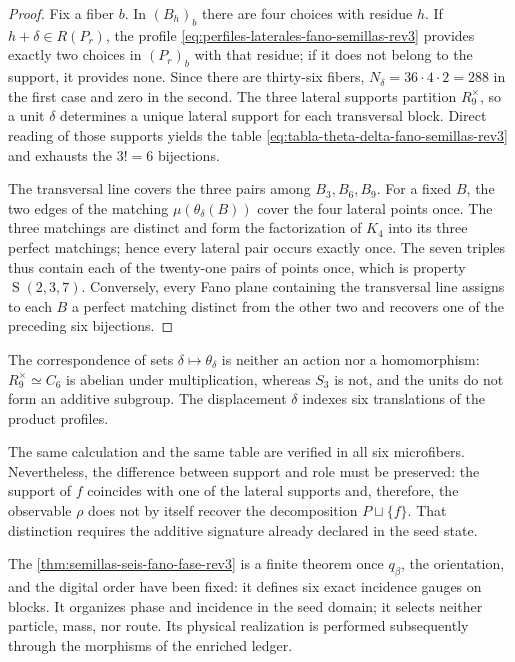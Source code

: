 \begin{proof}
Fix a fiber \(b\). In \((B_h)_b\) there are four choices with residue \(h\). If \(h+\delta\in R(P_r)\), the profile \eqref{eq:perfiles-laterales-fano-semillas-rev3} provides exactly two choices in \((P_r)_b\) with that residue; if it does not belong to the support, it provides none. Since there are thirty-six fibers, \(N_\delta=36\cdot4\cdot2=288\) in the first case and zero in the second. The three lateral supports partition \(R_9^\times\), so a unit \(\delta\) determines a unique lateral support for each transversal block. Direct reading of those supports yields the table \eqref{eq:tabla-theta-delta-fano-semillas-rev3} and exhausts the \(3!=6\) bijections.

The transversal line covers the three pairs among \(B_3,B_6,B_9\). For a fixed \(B\), the two edges of the matching \(\mu(\theta_\delta(B))\) cover the four lateral points once. The three matchings are distinct and form the factorization of \(K_4\) into its three perfect matchings; hence every lateral pair occurs exactly once. The seven triples thus contain each of the twenty-one pairs of points once, which is property \(\operatorname{S}(2,3,7)\). Conversely, every Fano plane containing the transversal line assigns to each \(B\) a perfect matching distinct from the other two and recovers one of the preceding six bijections.
\end{proof}

The correspondence of sets \(\delta\mapsto\theta_\delta\) is neither an
action nor a homomorphism: \(R_9^\times\simeq C_6\) is abelian under
multiplication, whereas \(S_3\) is not, and the units do not form an additive
subgroup. The displacement \(\delta\) indexes six translations of the product
profiles.

The same calculation and the same table are verified in all six microfibers. Nevertheless,
the difference between support and role must be preserved: the support of
\(f\) coincides with one of the lateral supports and, therefore, the observable
\(\rho\) does not by itself recover the decomposition \(P\sqcup\{f\}\). That
distinction requires the additive signature already declared in the seed state.

\begin{statusbox}[title={Status and scope of Fano incidence}]
The \cref{thm:semillas-seis-fano-fase-rev3} is a finite theorem once
\(q_\beta\), the orientation, and the digital order have been fixed: it defines six exact
incidence gauges on blocks. It organizes phase and incidence in the seed domain;
it selects neither particle, mass, nor route. Its physical realization is performed
subsequently through the morphisms of the enriched ledger.
\end{statusbox}

